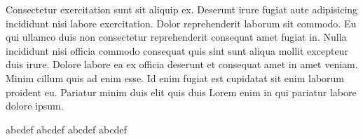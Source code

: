 Consectetur exercitation sunt sit aliquip ex. Deserunt irure fugiat aute adipisicing incididunt nisi labore exercitation. Dolor reprehenderit laborum sit commodo. Eu qui ullamco duis non consectetur reprehenderit consequat amet fugiat in. Nulla incididunt nisi officia commodo consequat quis sint sunt aliqua mollit excepteur duis irure. Dolore labore ea ex officia deserunt et consequat amet in amet veniam. Minim cillum quis ad enim esse. Id enim fugiat est cupidatat sit enim laborum proident eu. Pariatur minim duis elit quis duis Lorem enim in qui pariatur labore dolore ipsum.




abc{\mktsFontfileSunexta\color{red}}def
abc{\mktsFontfileSunexta\color{red}}def
abc{\color{red}}def
abcdef



